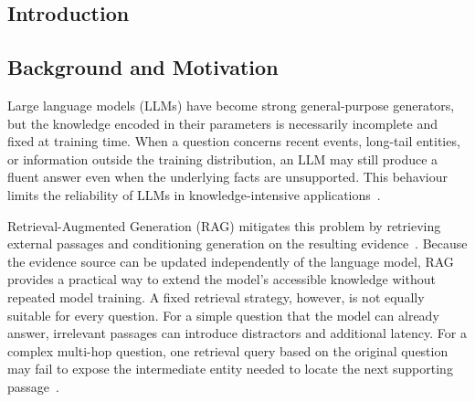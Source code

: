 \documentclass{nthu_thesis}
\begin{document}
\begin{thesiscjk}

\tableofcontents
{}
\clearpage

\listoffigures  %
\clearpage

\listoftables  %
\clearpage



\mainmatter  %

\pagestyle{plain} %
\chapter{Introduction}
\label{ch:introduction}

\section{Background and Motivation}

Large language models (LLMs) have become strong general-purpose generators, but the knowledge encoded in their parameters is necessarily incomplete and fixed at training time. When a question concerns recent events, long-tail entities, or information outside the training distribution, an LLM may still produce a fluent answer even when the underlying facts are unsupported. This behaviour limits the reliability of LLMs in knowledge-intensive applications~\cite{hallucination_survey}.

Retrieval-Augmented Generation (RAG) mitigates this problem by retrieving external passages and conditioning generation on the resulting evidence~\cite{rag_survey}. Because the evidence source can be updated independently of the language model, RAG provides a practical way to extend the model's accessible knowledge without repeated model training. A fixed retrieval strategy, however, is not equally suitable for every question. For a simple question that the model can already answer, irrelevant passages can introduce distractors and additional latency. For a complex multi-hop question, one retrieval query based on the original question may fail to expose the intermediate entity needed to locate the next supporting passage~\cite{ren2023,ircot}.


\end{thesiscjk}
\end{document}
